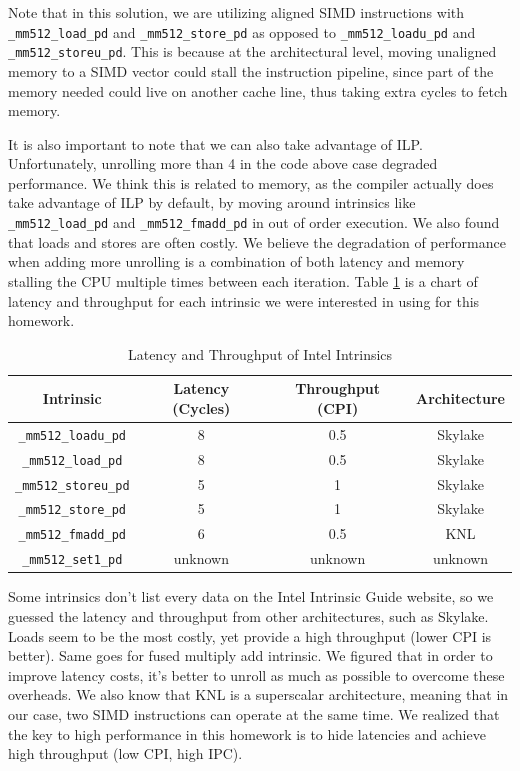\documentclass{article}
\begin{document}
Note that in this solution, we are utilizing aligned SIMD instructions with \verb|_mm512_load_pd| and \verb|_mm512_store_pd| as opposed to \verb|_mm512_loadu_pd| and \verb|_mm512_storeu_pd|. This is because at the architectural level, moving unaligned memory to a SIMD vector could stall the instruction pipeline, since part of the memory needed could live on another cache line, thus taking extra cycles to fetch memory. 

It is also important to note that we can also take advantage of ILP. Unfortunately, unrolling more than 4 in the code above case degraded performance. We think this is related to memory, as the compiler actually does take advantage of ILP by default, by moving around intrinsics like \verb|_mm512_load_pd| and \verb|_mm512_fmadd_pd| in out of order execution. We also found that loads and stores are often costly. We believe the degradation of performance when adding more unrolling is a combination of both latency and memory stalling the CPU multiple times between each iteration. Table \ref{table:nonlin} is a chart of latency and throughput for each intrinsic we were interested in using for this homework.

\begin{table}[ht]
\caption{Latency and Throughput of Intel Intrinsics} %
\centering %
\begin{tabular}{c c c c} %
\hline\hline %
Intrinsic & Latency (Cycles) & Throughput (CPI) & Architecture \\ [0.5ex] %
\hline %
\verb|_mm512_loadu_pd| & 8 & 0.5 & Skylake \\
\verb|_mm512_load_pd| & 8 & 0.5 & Skylake \\
\verb|_mm512_storeu_pd| & 5 & 1  & Skylake \\
\verb|_mm512_store_pd| & 5 & 1  & Skylake \\
\verb|_mm512_fmadd_pd| & 6 & 0.5 & KNL \\
\verb|_mm512_set1_pd| & unknown & unknown & unknown \\
[1ex] %
\hline %
\end{tabular}
\label{table:nonlin} %
\end{table}

Some intrinsics don't list every data on the Intel Intrinsic Guide website, so we guessed the latency and throughput from other architectures, such as Skylake. Loads seem to be the most costly, yet provide a high throughput (lower CPI is better). Same goes for fused multiply add intrinsic. We figured that in order to improve latency costs, it's better to unroll as much as possible to overcome these overheads. We also know that KNL is a superscalar architecture, meaning that in our case, two SIMD instructions can operate at the same time. We realized that the key to high performance in this homework is to hide latencies and achieve high throughput (low CPI, high IPC).
\end{document}
